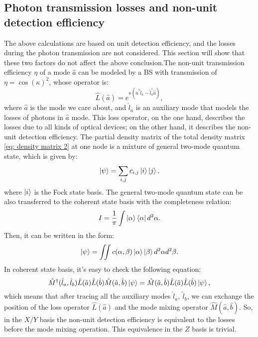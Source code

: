 \documentclass[aps,reprint,showpacs,superscriptaddress]{revtex4-2}
\begin{document}
\subsection{Photon transmission losses and non-unit detection efficiency}
The above calculations are based on unit detection efficiency, and the losses during the photon transmission are not considered. 
This section will show that these two factors do not affect the above conclusion.The non-unit transmission efficiency $\eta$ of a mode $\hat{a}$ can be modeled by a BS with transmission of $\eta=\cos(\kappa)^2$, whose operator is:
\begin{equation}
	\hat{L}(\hat{a})=e^{\kappa(\hat{a}^\dagger\hat{l}_a-\hat{l}_a^\dagger\hat{a})},
\end{equation}
where $\hat{a}$ is the mode we care about, and $\hat{l}_a$ is an auxiliary mode that models the losses of photons in $\hat{a}$ mode. This loss operator, on the one hand, describes the losses due to all kinds of optical devices; on the other hand, it describes the non-unit detection efficiency. The partial density matrix of the total density matrix \ref{eq: density matrix 2} at one node is a mixture of general two-mode quantum state, which is given by:
\begin{equation}
	\ket{\psi}=\sum_{i,j}c_{i,j}\ket{i}\ket{j},
\end{equation}
where $\ket{i}$ is the Fock state basis. The general two-mode quantum state can be also transferred to the coherent state basis with the completeness relation:
\begin{equation}
	I=\frac{1}{\pi}\int\ket{\alpha}\bra{\alpha}d^2\alpha.
\end{equation}
Then, it can be written in the form:
\begin{equation}
	\ket{\psi}=\iint c(\alpha,\beta)\ket{\alpha}\ket{\beta}d^2\alpha d^2\beta.
\end{equation}
In coherent state basis, it's easy to check the following equation:
\begin{equation}
	\hat{M}^\dagger(\hat{l}_a,\hat{l}_b)\hat{L}(\hat{a})\hat{L}(\hat{b})\hat{M}(\hat{a},\hat{b})\ket{\psi}=\hat{M}(\hat{a},\hat{b})\hat{L}(\hat{a})\hat{L}(\hat{b})\ket{\psi},
\end{equation}
which means that after tracing all the auxiliary modes $\hat{l}_a,\ \hat{l}_b$, we can exchange the position of the loss operator $\hat{L}(\hat{a})$ and the mode mixing operator $\hat{M}(\hat{a},\hat{b})$. So, in the $X/Y$ basis the non-unit detection efficiency is equivalent to the losses before the mode mixing operation. This equivalence in the $Z$ basis is trivial.
\end{document}
